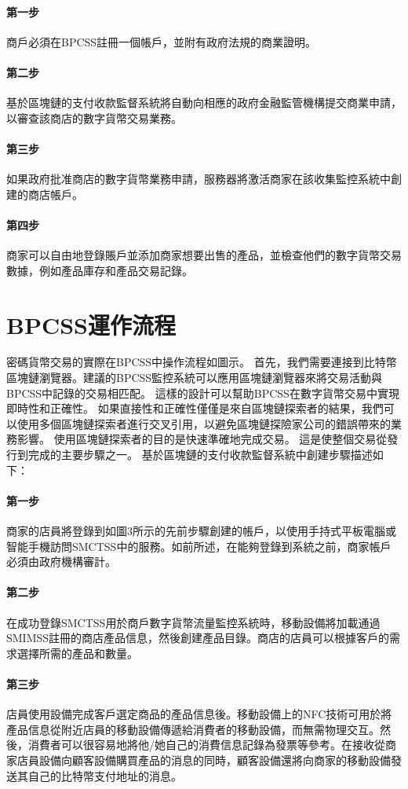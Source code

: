 		\paragraph{第一步}商戶必須在BPCSS註冊一個帳戶，並附有政府法規的商業證明。
		\paragraph{第二步}基於區塊鏈的支付收款監督系統將自動向相應的政府金融監管機構提交商業申請，以審查該商店的數字貨幣交易業務。
		\paragraph{第三步}如果政府批准商店的數字貨幣業務申請，服務器將激活商家在該收集監控系統中創建的商店帳戶。
		\paragraph{第四步}商家可以自由地登錄賬戶並添加商家想要出售的產品，並檢查他們的數字貨幣交易數據，例如產品庫存和產品交易記錄。

	\section{BPCSS運作流程}
	密碼貨幣交易的實際在BPCSS中操作流程如圖示。 首先，我們需要連接到比特幣區塊鏈瀏覽器。建議的BPCSS監控系統可以應用區塊鏈瀏覽器來將交易活動與BPCSS中記錄的交易相匹配。 這樣的設計可以幫助BPCSS在數字貨幣交易中實現即時性和正確性。 如果直接性和正確性僅僅是來自區塊鏈探索者的結果，我們可以使用多個區塊鏈探索者進行交叉引用，以避免區塊鏈探險家公司的錯誤帶來的業務影響。 使用區塊鏈探索者的目的是快速準確地完成交易。 這是使整個交易從發行到完成的主要步驟之一。
	基於區塊鏈的支付收款監督系統中創建步驟描述如下：
		\paragraph{第一步}商家的店員將登錄到如圖3所示的先前步驟創建的帳戶，以使用手持式平板電腦或智能手機訪問SMCTSS中的服務。如前所述，在能夠登錄到系統之前，商家帳戶必須由政府機構審計。
		\paragraph{第二步}在成功登錄SMCTSS用於商戶數字貨幣流量監控系統時，移動設備將加載通過SMIMSS註冊的商店產品信息，然後創建產品目錄。商店的店員可以根據客戶的需求選擇所需的產品和數量。
		\paragraph{第三步}店員使用設備完成客戶選定商品的產品信息後。移動設備上的NFC技術可用於將產品信息從附近店員的移動設備傳遞給消費者的移動設備，而無需物理交互。然後，消費者可以很容易地將他/她自己的消費信息記錄為發票等參考。在接收從商家店員設備向顧客設備購買產品的消息的同時，顧客設備還將向商家的移動設備發送其自己的比特幣支付地址的消息。
